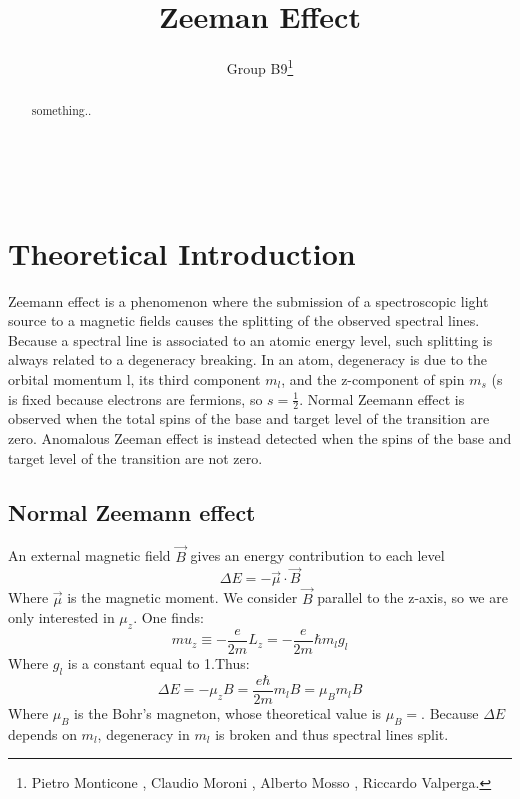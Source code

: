 \documentclass[a4paper,12pt,abstracton]{scrartcl}
\title{Zeeman Effect}
\author{Group B9\footnote{Pietro Monticone , Claudio Moroni , Alberto Mosso , Riccardo Valperga.}}
\begin{document}
\maketitle
\makenomenclature
\begin{abstract}
something..
\end{abstract}
\clearpage
\tableofcontents

\mbox{
}
\newpage
\setlength{\columnsep}{27pt} 
\begin{multicols}{2}
\printnomenclature
\end{multicols}
\newpage
\section{Theoretical Introduction}
Zeemann effect is a phenomenon where the submission of a spectroscopic light source to a magnetic fields causes the splitting of the observed spectral lines. Because a spectral line is associated to an atomic energy level, such splitting is always related to a degeneracy breaking. In an atom, degeneracy is due to the orbital momentum l, its third component $m_l$, and the z-component of spin $m_s$ (s is fixed  because electrons are fermions, so $s=\frac{1}{2}$.\newline
Normal Zeemann effect is observed when the total spins of the base and target level of the transition are zero.
Anomalous Zeeman effect is instead detected when the spins of the base and target level of the transition are not zero.
\subsection{Normal Zeemann effect}
An external magnetic field $\vec{B}$ gives an energy contribution to each level
\begin{equation}
\Delta E = - \vec{\mu} \cdot \vec{B}
\end{equation}
Where $\vec{\mu}$ is the magnetic moment. We consider $\vec{B}$ parallel to the z-axis, so we are only interested in $\mu_z$. One finds: 
\begin{equation}
mu_z \equiv -\frac{e}{2m}L_z = -\frac{e}{2m}\hbar m_lg_l
\end{equation}
Where $g_l$ is a constant equal to 1.Thus:
\begin{equation}
\Delta E = - \mu_z B = \frac{e \hbar}{2m} m_l B = \mu_B m_l B
\end{equation}
Where $\mu_B$ is the Bohr's magneton, whose theoretical value is
$\mu_B = $. Because $\Delta E$ depends on $m_l$, degeneracy in $m_l$ is broken and thus spectral lines split.
\end{document}
